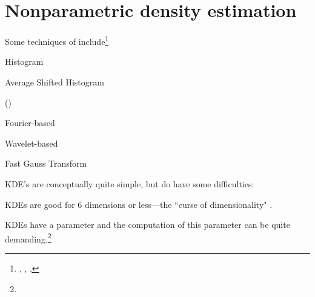 
\section{Nonparametric density estimation}
Some techniques of  include\footnote{
  ,
  ,
  ,
  }
\begin{listi}
  \item Histogram %
  \item Average Shifted Histogram
  \item {} ()
  \item Fourier-based
  \item Wavelet-based
  \item Fast Gauss Transform
\end{listi}

KDE's are conceptually quite simple, but do have some difficulties:
\begin{listi}
  \item KDEs are good for 6 dimensions or less---the ``curse of dimensionality" .
  \item KDEs have a  parameter and the computation of this parameter can be quite demanding.\footnote{
        }
\end{listi}

